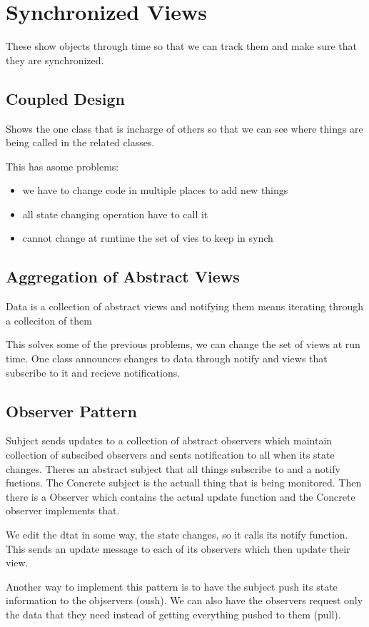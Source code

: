 \documentclass[12pt]{article}
\begin{document}
\section{Synchronized Views}
These show objects through time so that we can track them and make sure that they are synchronized.

\subsection{Coupled Design}
Shows the one class that is incharge of others so that we can see where things are being called in the related classes.

This has asome problems:
\begin{itemize}
    \item we have to change code in multiple places to add new things
    \item all state changing operation have to call it
    \item cannot change at runtime the set of vies to keep in synch
\end{itemize}
\subsection{Aggregation of Abstract Views}
Data is a collection of abstract views and notifying them means iterating through a colleciton of them

This solves some of the previous problems, we can change the set of views at run time. One class announces changes to data through notify and views that subscribe to it and recieve notifications.

\subsection{Observer Pattern}
Subject sends updates to a collection of abstract observers which maintain collection of subscibed observers and sents notification to all when its state changes. Theres an abstract subject that all things subscribe to and a notify fuctions. The Concrete subject is the actuall thing that is being monitored. Then there is a Observer which contains the actual update function and the Concrete observer implements that.

We edit the dtat in some way, the state changes, so it calls its notify function. This sends an update message to each of its observers which then update their view.

Another way to implement this pattern is to have the subject push its state information to the objservers (oush). We can also have the observers request only the data that they need instead of getting everything pushed to them (pull).
\end{document}
